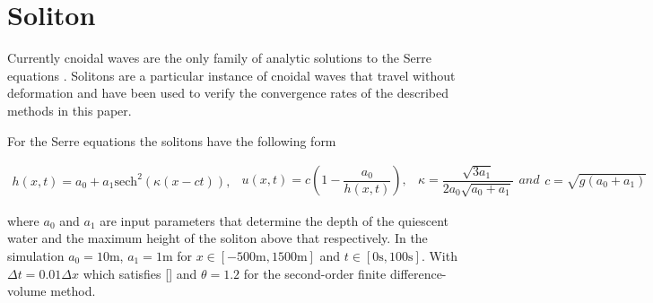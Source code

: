 \documentclass[SingleSpace,12pt,Proceedings]{Serre_ASCE}
\begin{document}
\section{Soliton}
\label{section:Convergence Rate}
Currently cnoidal waves are the only family of analytic solutions to the Serre equations \cite{Carter-Cienfuegos-2010-259}. Solitons are a particular instance of cnoidal waves that travel without deformation and have been used to verify the convergence rates of the described methods in this paper. 

For the Serre equations the solitons have the following form
\begin{linenomath*}
\begin{subequations}
\begin{gather}
h\left(x,t\right) = a_0 + a_1\text{sech}^2\left( \kappa\left(x - ct\right)\right),
\end{gather}
\begin{gather}
u\left(x,t\right) = c\left(1 - \dfrac{a_0}{h(x,t)} \right),
\end{gather}
\begin{gather}
\kappa = \dfrac{\sqrt{3a_1}}{2a_0 \sqrt{ a_0 + a_1}}
\end{gather}
and
\begin{gather}
c = \sqrt{g \left(a_0 + a_1\right)}
\end{gather}
\end{subequations}
\label{eq:sol}
\end{linenomath*}
where $a_0$ and $a_1$ are input parameters that determine the depth of the quiescent water and the maximum height of the soliton above that respectively. In the simulation $a_0 = 10\text{m}$, $a_1 = 1\text{m}$ for $x\in\left[-500\text{m},1500\text{m}\right]$ and $t\in\left[0\text{s},100\text{s}\right]$. With $\Delta t = 0.01 \Delta x$ which satisfies [] and $\theta = 1.2$ for the second-order finite difference-volume method.

\end{document}
